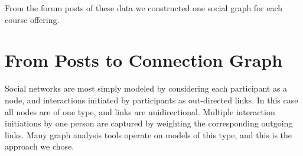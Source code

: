 
From the forum posts of these data we constructed one social graph for
each course offering.

\section{From Posts to Connection Graph}

Social networks are most simply modeled by considering each
participant as a node, and interactions initiated by participants as
out-directed links. In this case all nodes are of one type, and links
are unidirectional. Multiple interaction initiations by one person are
captured by weighting the corresponding outgoing links. Many graph
analysis tools operate on models of this type, and this is the
approach we chose.

